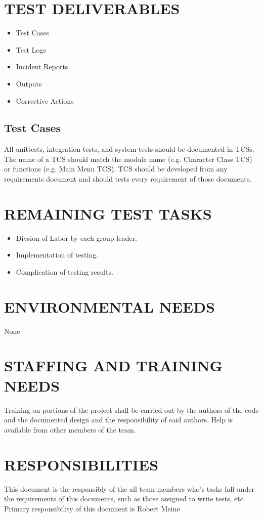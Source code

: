 \documentclass[report]{article}
\begin{document}
\section[TEST DELIVERABLES]{TEST DELIVERABLES}
\begin{itemize}
\item Test Cases
\item Test Logs
\item Incident Reports
\item Outputs
\item Corrective Actions
\end{itemize}

\subsection{Test Cases}

All unittests, integration tests, and system tests should be documented in TCSs. The name of a TCS should match the module name (e.g. Character Class TCS) or functions (e.g. Main Menu TCS). TCS should be developed from any requirements document and should tests every requirement of those documents.

\section[REMAINING TEST TASKS]{REMAINING TEST TASKS}

\begin{itemize}
\item Divsion of Labor by each group leader.
\item Implementation of testing.
\item Complication of testing results.
\end{itemize}

\section[EVIRONMENTAL NEEDS]{ENVIRONMENTAL NEEDS}
None

\section[STAFFING AND TRAINING NEEDS]{STAFFING AND TRAINING NEEDS}
Training on portions of the project shall be carried out by the authors of the code and the documented design and the responsibility of said authors. Help is available from other members of the team.


\section[RESPONSIBILITIES]{RESPONSIBILITIES}
This document is the responsibly of the all team members who's tasks fall under the requirements of this documents, such as those assigned to write tests, etc. Primary responsibility of this document is Robert Meine
\end{document}
